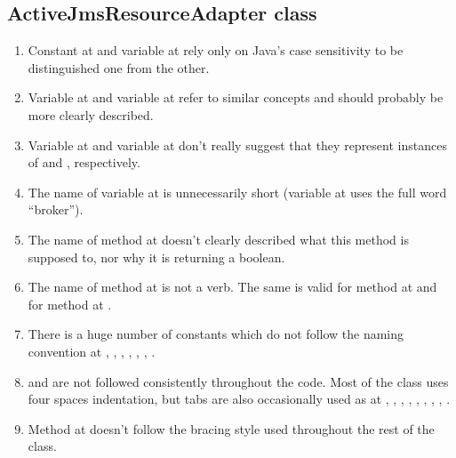 \subsection{ActiveJmsResourceAdapter class}
\begin{enumerate}
	\item {} Constant  at  and variable  at  rely only on Java's case sensitivity to be distinguished one from the other. 
	\item {} Variable  at  and variable  at  refer to similar concepts and should probably be more clearly described. 
	\item {} Variable  at  and variable  at  don't really suggest that they represent instances of  and , respectively.
	\item {} The name of variable  at  is unnecessarily short (variable  at  uses the full word “broker”). 
	\item {} The name of method  at  doesn't clearly described what this method is supposed to, nor why it is returning a boolean. 
	\item {} The name of method  at  is not a verb. The same is valid for method  at  and for method  at .
	\item {} There is a huge number of constants which do not follow the naming convention at , , , , , , . 
	\item {} and  are not followed consistently throughout the code. Most of the class uses four spaces indentation, but tabs are also occasionally used as at , , , , , , , , . 
	\item {} Method  at  doesn't follow the bracing style used throughout the rest of the class.

\end{enumerate}
